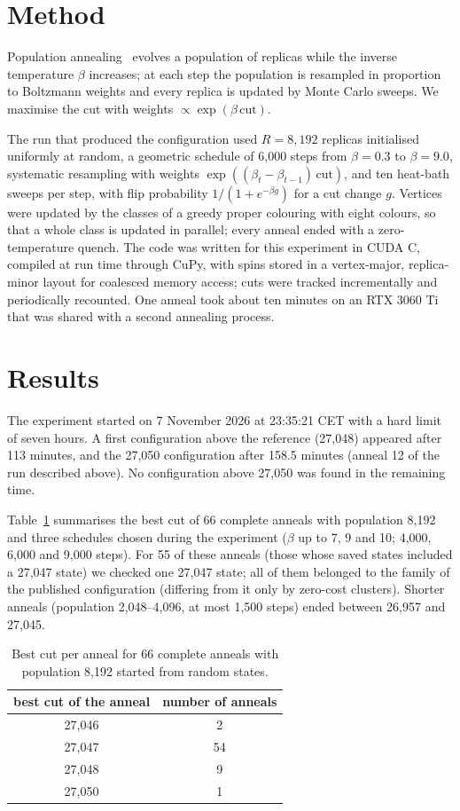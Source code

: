 \documentclass[11pt]{article}
\begin{document}
\section{Method}
Population annealing~\cite{hukushima2003,machta2010,wang2015} evolves a population of replicas while the inverse temperature
$\beta$ increases; at each step the population is resampled in proportion to Boltzmann weights and every replica is updated by
Monte Carlo sweeps. We maximise the cut with weights $\propto \exp(\beta\,\mathrm{cut})$.

The run that produced the configuration used $R=8{,}192$ replicas initialised uniformly at random, a geometric schedule of
6,000 steps from $\beta=0.3$ to $\beta=9.0$, systematic resampling with weights $\exp((\beta_t-\beta_{t-1})\,\mathrm{cut})$,
and ten heat-bath sweeps per step, with flip probability $1/(1+e^{-\beta g})$ for a cut change $g$. Vertices were updated by the
classes of a greedy proper colouring with eight colours, so that a whole class is updated in parallel; every anneal ended with a
zero-temperature quench. The code was written for this experiment in CUDA C, compiled at run time through CuPy, with spins stored
in a vertex-major, replica-minor layout for coalesced memory access; cuts were tracked incrementally and periodically recounted.
One anneal took about ten minutes on an RTX 3060 Ti that was shared with a second annealing process.

\section{Results}
The experiment started on 7 November 2026 at 23:35:21 CET with a hard limit of seven hours. A first configuration above the
reference (27,048) appeared after 113 minutes, and the 27,050 configuration after 158.5 minutes (anneal 12 of the run described
above). No configuration above 27,050 was found in the remaining time.

Table~\ref{tab:stats} summarises the best cut of 66 complete anneals with population 8,192 and three schedules chosen during the
experiment ($\beta$ up to 7, 9 and 10; 4,000, 6,000 and 9,000 steps). For 55 of these anneals (those whose saved states included a 27,047 state) we checked one 27,047 state; all
of them belonged to the family of the published configuration (differing from it only by zero-cost clusters). Shorter anneals
(population 2,048--4,096, at most 1,500 steps) ended between 26,957 and 27,045.

\begin{table}[h]
\centering
\begin{tabular}{cc}
\toprule
best cut of the anneal & number of anneals \\
\midrule
27,046 & 2 \\
27,047 & 54 \\
27,048 & 9 \\
27,050 & 1 \\
\bottomrule
\end{tabular}
\caption{Best cut per anneal for 66 complete anneals with population 8,192 started from random states.}
\label{tab:stats}
\end{table}
\end{document}
